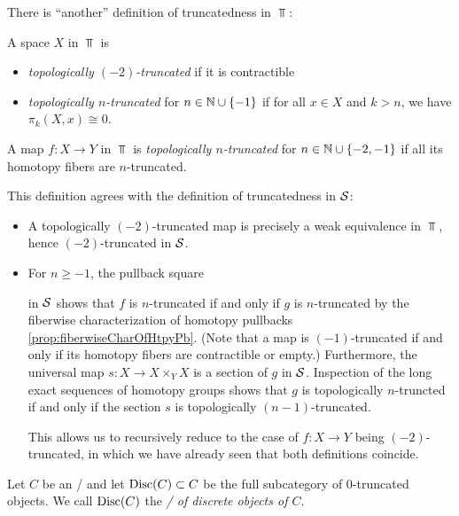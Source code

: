 \begin{remark}
    There is ``another'' definition of truncatedness in $\Top$:

    A space $X$ in $\Top$ is 
    \begin{itemize}
        \item \emph{topologically $(-2)$-truncated} if it is contractible 
        \item \emph{topologically $n$-truncated} for $n\in\mathbb{N}\cup\left\lbrace-1\right\rbrace$ if for all $x\in X$ and $k>n$, we have $\pi_k(X,x)\cong 0$.
    \end{itemize}
    A map $f\colon X\to Y$ in $\Top$ is \emph{topologically $n$-truncated} for $n\in\mathbb{N}\cup\left\lbrace-2,-1\right\rbrace$ if all its homotopy fibers are $n$-truncated.
    
    This definition agrees with the definition of truncatedness in $\mathcal{S}$:
    \begin{itemize}
        \item A topologically $(-2)$-truncated map is precisely a weak equivalence in $\Top$, hence $(-2)$-truncated in $\mathcal{S}$.
        \item For $n\geq -1$, the pullback square
        \begin{center}
        \end{center}
        in $\mathcal{S}$ shows that $f$ is $n$-truncated if and only if $g$ is $n$-truncated by the fiberwise characterization of homotopy pullbacks \cref{prop:fiberwiseCharOfHtpyPb}.
        (Note that a map is $(-1)$-truncated if and only if its homotopy fibers are contractible or empty.)
        Furthermore, the universal map $s\colon X\to X\times_Y X$ is a section of $g$ in $\mathcal{S}$.
        Inspection of the long exact sequences of homotopy groups shows that $g$ is topologically $n$-truncted if and only if the section $s$ is topologically $(n-1)$-truncated.

        This allows us to recursively reduce to the case of $f\colon X\to Y$ being $(-2)$-truncated, in which we have already seen that both definitions coincide.
    \end{itemize}
\end{remark}
\begin{definition}
    Let $C$ be an \inftytop/ and let $\operatorname{Disc}(C)\subset C$ be the full subcategory of $0$-truncated objects.
    We call $\operatorname{Disc}(C)$ the \emph{\inftycat/ of discrete objects of $C$}.
\end{definition}
